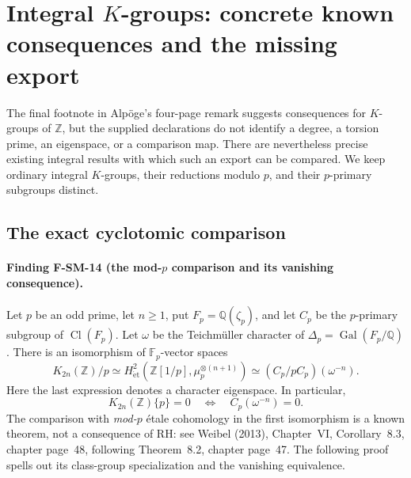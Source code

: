 \section{Integral $K$-groups: concrete known consequences and the missing export}
\label{sec:source-K-bridge}

The final footnote in Alp\"oge's four-page remark suggests consequences for
$K$-groups of $\mathbb Z$, but the supplied declarations do not identify a
degree, a torsion prime, an eigenspace, or a comparison map.  There are
nevertheless precise existing integral results with which such an export
can be compared.  We keep ordinary integral $K$-groups, their reductions
modulo $p$, and their $p$-primary subgroups distinct.

\subsection{The exact cyclotomic comparison}

\paragraph{Finding F-SM-14 (the mod-$p$ comparison and its vanishing consequence).}
Let $p$ be an odd prime, let $n\geq1$, put
$F_p=\mathbb Q(\zeta_p)$, and let $C_p$ be the $p$-primary subgroup of
$\operatorname{Cl}(F_p)$.  Let $\omega$ be the Teichm\"uller character of
$\Delta_p=\operatorname{Gal}(F_p/\mathbb Q)$.  There is an isomorphism of
$\mathbb F_p$-vector spaces
\begin{equation}\label{eq:SM-Kclass}
 K_{2n}(\mathbb Z)/p
 \simeq H^2_{\mathrm{\acute et}}
       (\mathbb Z[1/p],\mu_p^{\otimes(n+1)})
 \simeq (C_p/pC_p)(\omega^{-n}).
\end{equation}
Here the last expression denotes a character eigenspace.  In particular,
\[
 K_{2n}(\mathbb Z)\{p\}=0
 \quad\Longleftrightarrow\quad C_p(\omega^{-n})=0.
\]
The comparison with \emph{mod-$p$} \'etale cohomology in the first
isomorphism is a known theorem, not a consequence of RH: see Weibel
(2013), Chapter~VI, Corollary~8.3, chapter page~48, following
Theorem~8.2, chapter page~47.  The following proof spells out its
class-group specialization and the vanishing equivalence.

